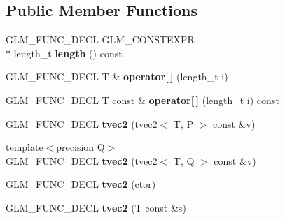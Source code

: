 \subsection*{Public Member Functions}
\begin{DoxyCompactItemize}
\item 
\hypertarget{structglm_1_1detail_1_1tvec2_aa00a8cbf2d75a3ed2d9f9981ce4d4a93}{G\-L\-M\-\_\-\-F\-U\-N\-C\-\_\-\-D\-E\-C\-L G\-L\-M\-\_\-\-C\-O\-N\-S\-T\-E\-X\-P\-R \\*
length\-\_\-t {\bfseries length} () const }\label{structglm_1_1detail_1_1tvec2_aa00a8cbf2d75a3ed2d9f9981ce4d4a93}

\item 
\hypertarget{structglm_1_1detail_1_1tvec2_acae6c81d07fce7bf13265a8a1d9fb24c}{G\-L\-M\-\_\-\-F\-U\-N\-C\-\_\-\-D\-E\-C\-L T \& {\bfseries operator\mbox{[}$\,$\mbox{]}} (length\-\_\-t i)}\label{structglm_1_1detail_1_1tvec2_acae6c81d07fce7bf13265a8a1d9fb24c}

\item 
\hypertarget{structglm_1_1detail_1_1tvec2_a837e74429055b5f3bcfc5bf16eab4682}{G\-L\-M\-\_\-\-F\-U\-N\-C\-\_\-\-D\-E\-C\-L T const \& {\bfseries operator\mbox{[}$\,$\mbox{]}} (length\-\_\-t i) const }\label{structglm_1_1detail_1_1tvec2_a837e74429055b5f3bcfc5bf16eab4682}

\item 
\hypertarget{structglm_1_1detail_1_1tvec2_a764076eb651c2fd732122e24bb882dbf}{G\-L\-M\-\_\-\-F\-U\-N\-C\-\_\-\-D\-E\-C\-L {\bfseries tvec2} (\hyperlink{structglm_1_1detail_1_1tvec2}{tvec2}$<$ T, P $>$ const \&v)}\label{structglm_1_1detail_1_1tvec2_a764076eb651c2fd732122e24bb882dbf}

\item 
\hypertarget{structglm_1_1detail_1_1tvec2_a6a255de24aea35da27b4f41579b3d56f}{{\footnotesize template$<$precision Q$>$ }\\G\-L\-M\-\_\-\-F\-U\-N\-C\-\_\-\-D\-E\-C\-L {\bfseries tvec2} (\hyperlink{structglm_1_1detail_1_1tvec2}{tvec2}$<$ T, Q $>$ const \&v)}\label{structglm_1_1detail_1_1tvec2_a6a255de24aea35da27b4f41579b3d56f}

\item 
\hypertarget{structglm_1_1detail_1_1tvec2_af5e5e83f86c18552e4e1045d74f676ad}{G\-L\-M\-\_\-\-F\-U\-N\-C\-\_\-\-D\-E\-C\-L {\bfseries tvec2} (ctor)}\label{structglm_1_1detail_1_1tvec2_af5e5e83f86c18552e4e1045d74f676ad}

\item 
\hypertarget{structglm_1_1detail_1_1tvec2_a85607050278fcecc58b31197bfff1661}{G\-L\-M\-\_\-\-F\-U\-N\-C\-\_\-\-D\-E\-C\-L {\bfseries tvec2} (T const \&s)}\label{structglm_1_1detail_1_1tvec2_a85607050278fcecc58b31197bfff1661}


\end{DoxyCompactItemize}
